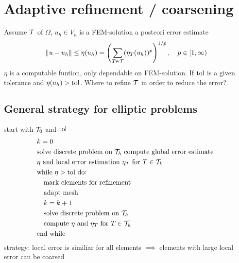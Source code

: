 \section{Adaptive refinement / coarsening}
Assume $\mathcal{T}$ of $\Omega$, $u_h\in V_h$ is a FEM-solution \nl
a posteori error estimate 
\begin{equation*}
	\|u-u_h\| \leq \eta(u_h) = \left( \displaystyle \sum_{T\in \mathcal{T}} (\eta_T(u_h))^p\right)^{1/p}, \quad p\in [1,\infty)
\end{equation*}
$\eta$ is a computable funtion, only dependable on FEM-solution. If $\text{tol}$ is a given tolerance and $\eta(u_h) > \text{tol}$. Where to refine $\mathcal{T}$ in order to reduce the error?
\subsection{General strategy for elliptic problems}
start with $\mathcal{T}_0$ and $\text{tol}$
\begin{align*}
	{}&k=0\\
	{}&\text{solve discrete problem on }\mathcal{T}_h \text{ compute global error estimate }\\
	{}& \eta \text{ and local error estimation } \eta_T \text{ for } T\in \mathcal{T}_k\\
	{}& \text{while }\eta > \text{tol} \text{ do:}\\
	{}& \quad \text{mark elements for refinement}\\
	{}& \quad \text{adapt mesh}\\
	{}& \quad k=k+1\\
	{}& \quad \text{solve discrete problem on }\mathcal{T}_h\\
	{}& \quad \text{compute }\eta \text{ and }\eta_T \text{ for } T\in \mathcal{T}_k\\
	{}& \text{end while	} 
\end{align*}
strategy: local error is similiar for all elements $\implies$ elements with large local error can be coarsed
